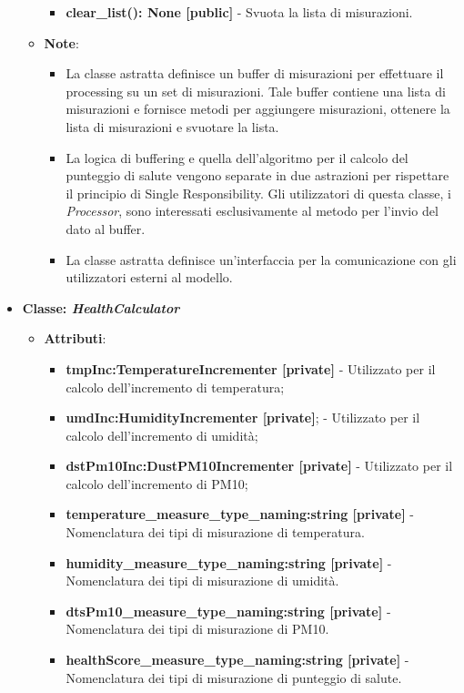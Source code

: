 \begin{itemize}
\begin{itemize}
\begin{itemize}
        \item \textbf{clear\_list(): None [public]} - Svuota la lista di misurazioni.
    \end{itemize}
    \item\textbf{Note}:
        \begin{itemize}
               \item La classe astratta definisce un buffer di misurazioni per effettuare il processing su un set di misurazioni. Tale buffer contiene una lista di misurazioni e fornisce metodi per aggiungere misurazioni, ottenere la lista di misurazioni e svuotare la lista.
                \item La logica di buffering e quella dell'algoritmo per il calcolo del punteggio di salute vengono separate in due astrazioni per rispettare il principio di Single Responsibility. Gli utilizzatori di questa classe, i \textit{Processor}, sono interessati esclusivamente al metodo per l'invio del dato al buffer.
                \item La classe astratta definisce un'interfaccia per la comunicazione con gli utilizzatori esterni al modello.
        \end{itemize}
    \end{itemize}
    \item{\textbf{Classe: \textit{HealthCalculator}}}
    \begin{itemize}
    \item\textbf{Attributi}:
        \begin{itemize}
        \item \textbf{tmpInc:TemperatureIncrementer [private]} - Utilizzato per il calcolo dell'incremento di temperatura;
        \item \textbf{umdInc:HumidityIncrementer [private]}; - Utilizzato per il calcolo dell'incremento di umidità;
        \item \textbf{dstPm10Inc:DustPM10Incrementer [private]} - Utilizzato per il calcolo dell'incremento di PM10;
        \item \textbf{temperature\_measure\_type\_naming:string [private]} - Nomenclatura dei tipi di misurazione di temperatura.
        \item \textbf{humidity\_measure\_type\_naming:string [private]} - Nomenclatura dei tipi di misurazione di umidità.
        \item \textbf{ dtsPm10\_measure\_type\_naming:string [private]} - Nomenclatura dei tipi di misurazione di PM10.
        \item \textbf{ healthScore\_measure\_type\_naming:string [private]} - Nomenclatura dei tipi di misurazione di punteggio di salute.

\end{itemize}
\end{itemize}
\end{itemize}

